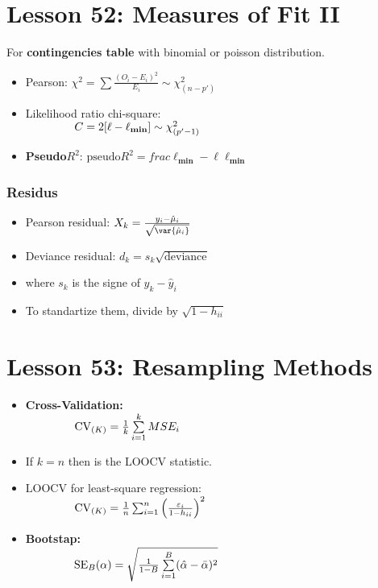 \documentclass[10pt, french]{article}
\begin{document}
\begin{multicols*}{3}
\section*{Lesson 52: Measures of Fit II}
For \textbf{contingencies table}  with binomial or poisson distribution.
\begin{itemize}[align=left,leftmargin=*]
   \item Pearson: $\chi^2 = \sum \frac{(O_i - E_i)^2}{E_i} \sim \chi_{(n-p')}^2$
   \item Likelihood ratio chi-square: \\ $\hspace*{1.5cm} C = 2[\ell - \ell_{\mathbf{min}}] \sim \chi_{(p'-1)}^2$
   \item \textbf{Pseudo}$R^2$: $\mathrm{pseudo}R^2 =
   frac{\ell_{\mathbf{min}} -  \ell}{\ell_{\mathbf{min}}}$
\end{itemize}
\subsubsection*{Residus}
\begin{itemize}[align=left,leftmargin=*]
   \item Pearson residual: $X_k = \frac{y_i - \hat{\mu}_i}{\sqrt{\var{\hat{\mu}_i}}}$
   \item Deviance residual: $d_k = s_k\sqrt{\mathrm{deviance}}$
   \item[] where $s_k$ is the signe of $y_k-\hat{y}_i$
   \item To standartize them, divide by $\sqrt{1-h_{ii}}$
\end{itemize}


\section*{Lesson 53: Resampling Methods}
\begin{itemize}[align=left,leftmargin=*]
   \item \textbf{Cross-Validation:}\\
  $\hspace*{1.5cm}  \mathrm{CV}_{(K)} = \frac{1}{k} \sum\limits_{i=1}^k MSE_i $
  \item[] If $k=n$ then is the $\mathrm{LOOCV}$ statistic.
  \item $\mathrm{LOOCV}$ for least-square regression: \\
  $\hspace*{1.5cm} \mathrm{CV}_{(K)} = \frac{1}{n} \sum_{i=1}^n \left( \frac{\varepsilon_i}{1-h_{ii}}\right)^2$
  \item \textbf{Bootstap:} \\
  $\hspace*{1.5cm} \mathrm{SE}_B(\alpha) = \sqrt{\frac{1}{1-B} \sum\limits_{i=1}^B (\hat{\alpha} - \bar{\alpha})^2}$
\end{itemize}


\end{multicols*}
\end{document}
